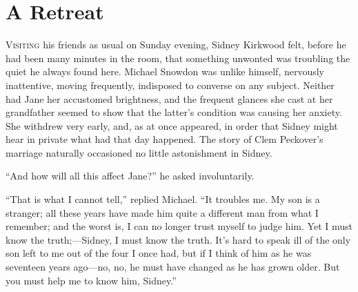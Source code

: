 \chapter{A Retreat}

\textsc{Visiting} his friends as usual on Sunday evening, Sidney
Kirkwood felt, before he had been many minutes in the room, that
something unwonted was troubling the quiet he always found here. Michael
Snowdon was unlike himself, nervously inattentive, moving frequently,
indisposed to converse on any subject. Neither had Jane her accustomed
brightness, and the frequent glances she cast at her grandfather seemed
to show that the latter's condition was causing her anxiety. She
withdrew very early, and, as at once appeared, in order that Sidney
might hear in private what had that day happened. The story of Clem
Peckover's marriage naturally occasioned no little astonishment in
Sidney.

{}``And how will all this affect Jane?'' he asked involuntarily.

``That is what I cannot tell,'' replied Michael. ``It troubles me. My
son is a stranger; all these years have made him quite a different man
from what I remember; and the worst is, I can no longer trust myself to
judge him. Yet I must know the truth;---Sidney, I must know the truth.
It's hard to speak ill of the only son left to me out of the four I once
had, but if I think of him as he was seventeen years ago---no, no, he
must have changed as he has grown older. But you must help me to know
him, Sidney.''

